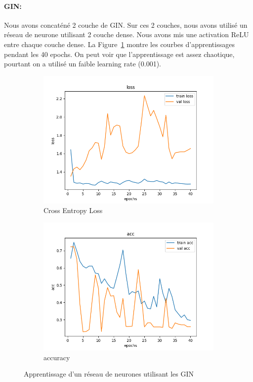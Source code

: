 \documentclass[a4paper]{article}
\begin{document}
\paragraph{GIN:}
Nous avons concaténé 2 couche de GIN. Sur ces 2 couches, nous avons utilisé un réseau de neurone utilisant 2 couche dense. Nous avons mis une activation ReLU entre chaque couche dense. La Figure~\ref{fig: GIN} montre les courbes d'apprentissages pendant les 40 epochs. On peut voir que l'apprentissage est assez chaotique, pourtant on a utilisé un faible learning rate (0.001).

\begin{figure}[ht]
    \begin{subfigure}{0.47\textwidth}
      \includegraphics[width=\linewidth]{../results/GIN_3/loss.png}
      \caption{Cross Entropy Loss}
    \end{subfigure}
    \hfill
    \begin{subfigure}{0.47\textwidth}
      \includegraphics[width=\linewidth]{../results/GIN_3/acc.png}
      \caption{accuracy}
    \end{subfigure}
    \caption{Apprentissage d'un réseau de neurones utilisant les GIN}
    \label{fig: GIN}
\end{figure}
\end{document}
